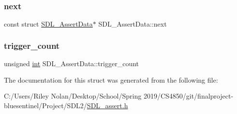 \mbox{\label{struct_s_d_l___assert_data_a2081dcf06dce4df497e423bccddfc099}} 
\subsubsection{\texorpdfstring{next}{next}}
{\footnotesize\ttfamily const struct \mbox{\hyperlink{struct_s_d_l___assert_data}{S\+D\+L\+\_\+\+Assert\+Data}}$\ast$ S\+D\+L\+\_\+\+Assert\+Data\+::next}

\mbox{\label{struct_s_d_l___assert_data_a230bbcc2d115aab04cf817773e08eb5b}} 
\subsubsection{\texorpdfstring{trigger\_count}{trigger\_count}}
{\footnotesize\ttfamily unsigned \mbox{\hyperlink{warnings_8h_a74f207b5aa4ba51c3a2ad59b219a423b}{int}} S\+D\+L\+\_\+\+Assert\+Data\+::trigger\+\_\+count}



The documentation for this struct was generated from the following file\+:\begin{DoxyCompactItemize}
\item 
C\+:/\+Users/\+Riley Nolan/\+Desktop/\+School/\+Spring 2019/\+C\+S4850/git/finalproject-\/bluesentinel/\+Project/\+S\+D\+L2/\mbox{\hyperlink{_s_d_l__assert_8h}{S\+D\+L\+\_\+assert.\+h}}\end{DoxyCompactItemize}
